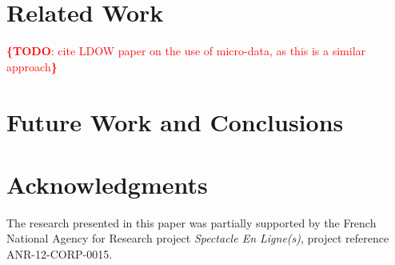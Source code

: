 \documentclass{sig-alternate}
\newcommand{\todo}[1]{\noindent\textcolor{red}{{\bf \{TODO}: #1{\bf \}}}}
\begin{document}
\section{Related Work}

\todo{cite LDOW paper on the use of micro-data, as this is a similar approach}

\section{Future Work and Conclusions}
\label{sec:future-work-conclusions}

\section*{Acknowledgments}
\footnotesize
The research presented in this paper was partially supported
by the French National Agency for Research  project
\emph{Spectacle En Ligne(s)}, project reference
\mbox{ANR-12-CORP-0015}.

\normalsize


\end{document}
